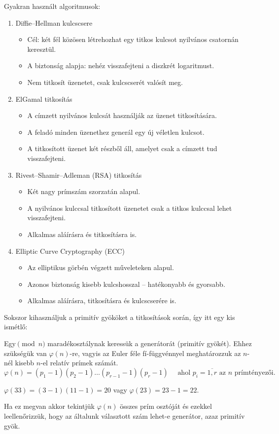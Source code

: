 Gyakran használt algoritmusok: 
\begin{enumerate}
\item Diffie--Hellman kulcscsere 
\begin{itemize}
\item Cél: két fél közösen létrehozhat egy titkos kulcsot nyilvános csatornán
keresztül. 
\item A biztonság alapja: nehéz visszafejteni a diszkrét logaritmust. 
\item Nem titkosít üzenetet, csak kulcscserét valósít meg. 
\end{itemize}
\item ElGamal titkosítás 
\begin{itemize}
\item A címzett nyilvános kulcsát használják az üzenet titkosítására. 
\item A feladó minden üzenethez generál egy új véletlen kulcsot. 
\item A titkosított üzenet két részből áll, amelyet csak a címzett tud visszafejteni. 
\end{itemize}
\item Rivest--Shamir--Adleman (RSA) titkosítás 
\begin{itemize}
\item Két nagy prímszám szorzatán alapul. 
\item A nyilvános kulccsal titkosított üzenetet csak a titkos kulccsal lehet
visszafejteni. 
\item Alkalmas aláírásra és titkosításra is. 
\end{itemize}
\item Elliptic Curve Cryptography (ECC) 
\begin{itemize}
\item Az elliptikus görbén végzett műveleteken alapul. 
\item Azonos biztonság kisebb kulcshosszal -- hatékonyabb és gyorsabb. 
\item Alkalmas aláírásra, titkosításra és kulcscserére is. 
\end{itemize}
\end{enumerate}
Sokszor kihasználjuk a primitív gyököket a titkosítások során, így
itt egy kis ismétlő:

Egy$\pmod n$ maradékosztálynak keressük a generátorát (primitív gyökét).
Ehhez szükségük van $\varphi(n)$-re, vagyis az Euler féle fí-függvénnyel
meghatározzuk az $n$-nél kisebb $n$-el relatív prímek számát. 
\[
\varphi(n)=(p_{1}-1)(p_{2}-1)\dots(p_{r-1}-1)(p_{r}-1)\quad\text{ ahol }p_{i}=\overline{1,r}\text{ az }n\text{ prímtényezői.}
\]
\begin{example}
$\varphi(33)=(3-1)(11-1)=20$ vagy $\varphi(23)=23-1=22$.
\end{example}
Ha ez megvan akkor tekintjük $\varphi(n)$ összes prím osztóját és
ezekkel leellenőrizzük, hogy az általunk választott szám lehet-e generátor,
azaz primitív gyök.


